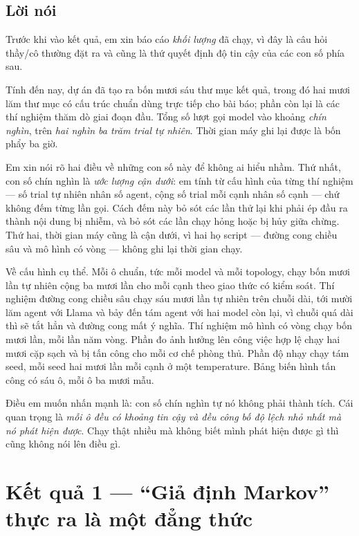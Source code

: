 \documentclass[11pt,a4paper]{article}
\newcommand{\slide}[1]{\section{#1}}
\newcommand{\loinoi}{\subsection*{Lời nói}}
\begin{document}
\loinoi
Trước khi vào kết quả, em xin báo cáo \emph{khối lượng} đã chạy, vì đây là câu hỏi thầy/cô
thường đặt ra và cũng là thứ quyết định độ tin cậy của các con số phía sau.

Tính đến nay, dự án đã tạo ra bốn mươi sáu thư mục kết quả, trong đó hai mươi lăm thư mục
có cấu trúc chuẩn dùng trực tiếp cho bài báo; phần còn lại là các thí nghiệm thăm dò giai
đoạn đầu. Tổng số lượt gọi model vào khoảng \emph{chín nghìn}, trên \emph{hai nghìn ba
trăm trial tự nhiên}. Thời gian máy ghi lại được là bốn phẩy ba giờ.

Em xin nói rõ hai điều về những con số này để không ai hiểu nhầm. Thứ nhất, con số chín
nghìn là \emph{ước lượng cận dưới}: em tính từ cấu hình của từng thí nghiệm --- số trial
tự nhiên nhân số agent, cộng số trial mỗi cạnh nhân số cạnh --- chứ không đếm từng lần
gọi. Cách đếm này bỏ sót các lần thử lại khi phải ép đầu ra thành nội dung bị nhiễm, và
bỏ sót các lần chạy hỏng hoặc bị hủy giữa chừng. Thứ hai, thời gian máy cũng là cận dưới,
vì hai họ script --- đường cong chiều sâu và mô hình có vòng --- không ghi lại thời gian
chạy.

Về cấu hình cụ thể. Mỗi ô chuẩn, tức mỗi model và mỗi topology, chạy bốn mươi lần tự
nhiên cộng ba mươi lần cho mỗi cạnh theo giao thức có kiểm soát. Thí nghiệm đường cong
chiều sâu chạy sáu mươi lần tự nhiên trên chuỗi dài, tới mười lăm agent với Llama và bảy
đến tám agent với hai model còn lại, vì chuỗi quá dài thì sẽ tắt hẳn và đường cong mất ý
nghĩa. Thí nghiệm mô hình có vòng chạy bốn mươi lần, mỗi lần năm vòng. Phần đo ảnh hưởng
lên công việc hợp lệ chạy hai mươi cặp sạch và bị tấn công cho mỗi cơ chế phòng thủ. Phần
độ nhạy chạy tám seed, mỗi seed hai mươi lần mỗi cạnh ở một temperature. Bảng biến hình
tấn công có sáu ô, mỗi ô ba mươi mẫu.

Điều em muốn nhấn mạnh là: con số chín nghìn tự nó không phải thành tích. Cái quan trọng
là \emph{mỗi ô đều có khoảng tin cậy và đều công bố độ lệch nhỏ nhất mà nó phát hiện
được}. Chạy thật nhiều mà không biết mình phát hiện được gì thì cũng không nói lên điều
gì.

\slide{Kết quả 1 --- ``Giả định Markov'' thực ra là một đẳng thức}
\end{document}
